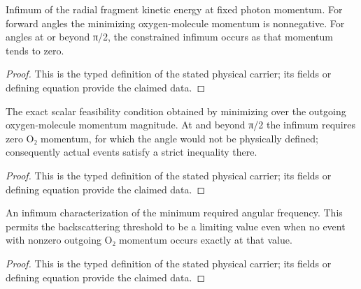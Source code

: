 \begin{definition}
  \label{def:physics:IPhO_2026_1_C_1:aux013}
  Infimum of the radial fragment kinetic energy at fixed photon momentum. For forward angles the minimizing oxygen-molecule momentum is nonnegative. For angles at or beyond π/2, the constrained infimum occurs as that momentum tends to zero.
\end{definition}
\begin{proof}
  This is the typed definition of the stated physical carrier; its fields or defining equation provide the claimed data.
\end{proof}

\begin{definition}
  \label{def:physics:IPhO_2026_1_C_1:aux014}
  The exact scalar feasibility condition obtained by minimizing over the outgoing oxygen-molecule momentum magnitude. At and beyond π/2 the infimum requires zero O₂ momentum, for which the angle would not be physically defined; consequently actual events satisfy a strict inequality there.
\end{definition}
\begin{proof}
  This is the typed definition of the stated physical carrier; its fields or defining equation provide the claimed data.
\end{proof}

\begin{definition}
  \label{def:physics:IPhO_2026_1_C_1:aux015}
  An infimum characterization of the minimum required angular frequency. This permits the backscattering threshold to be a limiting value even when no event with nonzero outgoing O₂ momentum occurs exactly at that value.
\end{definition}
\begin{proof}
  This is the typed definition of the stated physical carrier; its fields or defining equation provide the claimed data.
\end{proof}

